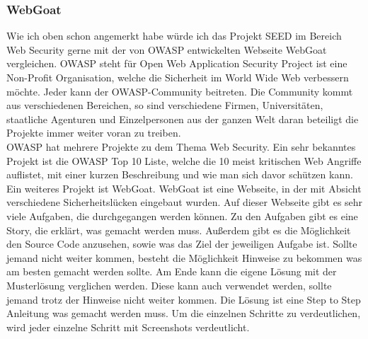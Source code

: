 \subsubsection{WebGoat}
Wie ich oben schon angemerkt habe würde ich das Projekt SEED im Bereich Web Security gerne mit der von OWASP entwickelten Webseite WebGoat vergleichen. OWASP steht für Open Web Application Security Project ist eine Non-Profit Organisation, welche die Sicherheit im World Wide Web verbessern möchte. Jeder kann der OWASP-Community beitreten. Die Community kommt aus verschiedenen Bereichen, so sind verschiedene Firmen, Universitäten, staatliche Agenturen und Einzelpersonen aus der ganzen Welt daran beteiligt die Projekte immer weiter voran zu treiben. \\
OWASP hat mehrere Projekte zu dem Thema Web Security. Ein sehr bekanntes Projekt ist die OWASP Top 10 Liste, welche die 10 meist kritischen Web Angriffe auflistet, mit einer kurzen Beschreibung und wie man sich davor schützen kann. Ein weiteres Projekt ist WebGoat. WebGoat ist eine Webseite, in der mit Absicht verschiedene Sicherheitslücken eingebaut wurden. Auf dieser Webseite gibt es sehr viele Aufgaben, die durchgegangen werden können. Zu den Aufgaben gibt es eine Story, die erklärt, was gemacht werden muss. Außerdem gibt es die Möglichkeit den Source Code anzusehen, sowie was das Ziel der jeweiligen Aufgabe ist. Sollte jemand nicht weiter kommen, besteht die Möglichkeit Hinweise zu bekommen was am besten gemacht werden sollte. Am Ende kann die eigene Lösung mit der Musterlösung verglichen werden. Diese kann auch verwendet werden, sollte jemand trotz der Hinweise nicht weiter kommen. Die Lösung ist eine Step to Step Anleitung was gemacht werden muss. Um die einzelnen Schritte zu verdeutlichen, wird jeder einzelne Schritt mit Screenshots verdeutlicht.

